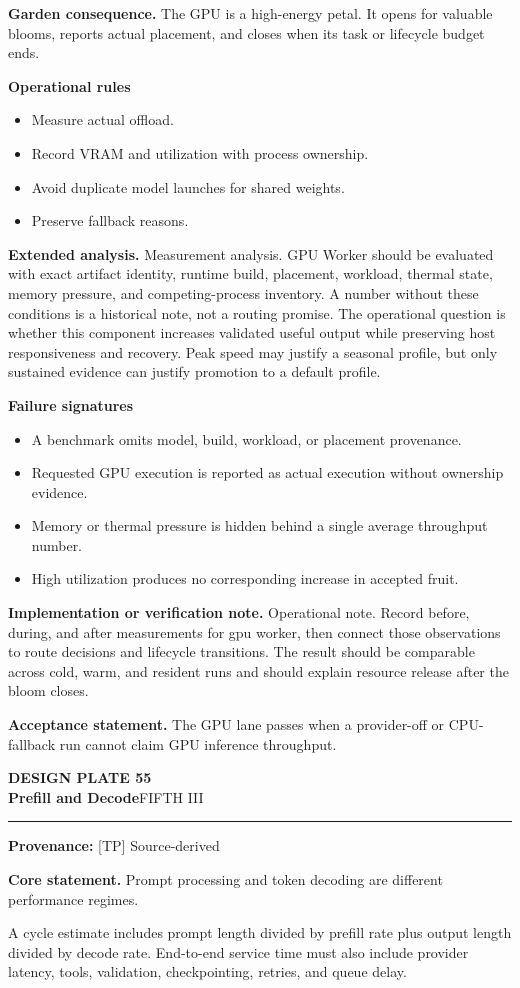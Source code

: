 \documentclass[10pt,letterpaper,oneside]{article}
\newcommand{\prov}[1]{\textcolor{gardenBlue}{\sffamily\footnotesize\textbf{Provenance:} #1}}
\newcommand{\platetitle}[3]{%
  \begin{minipage}[t][0.54in][t]{\textwidth}
  {\sffamily\bfseries\color{gardenDeep}\fontsize{9}{10}\selectfont DESIGN PLATE #1}\\[-1pt]
  {\sffamily\bfseries\color{gardenInk}\fontsize{16.5}{18}\selectfont #2}\hfill{\sffamily\color{gardenGreen}\large #3}
  \end{minipage}\vspace{-2pt}\hrule\vspace{5pt}}
\begin{document}
\textbf{Garden consequence.} The GPU is a high-energy petal. It opens for valuable blooms, reports actual placement, and closes when its task or lifecycle budget ends.

\textbf{Operational rules}
\begin{itemize}
\item Measure actual offload.
\item Record VRAM and utilization with process ownership.
\item Avoid duplicate model launches for shared weights.
\item Preserve fallback reasons.
\end{itemize}
\textbf{Extended analysis.} Measurement analysis. GPU Worker should be evaluated with exact artifact identity, runtime build, placement, workload, thermal state, memory pressure, and competing-process inventory. A number without these conditions is a historical note, not a routing promise. The operational question is whether this component increases validated useful output while preserving host responsiveness and recovery. Peak speed may justify a seasonal profile, but only sustained evidence can justify promotion to a default profile.

\textbf{Failure signatures}
\begin{itemize}
\item A benchmark omits model, build, workload, or placement provenance.
\item Requested GPU execution is reported as actual execution without ownership evidence.
\item Memory or thermal pressure is hidden behind a single average throughput number.
\item High utilization produces no corresponding increase in accepted fruit.
\end{itemize}
\textbf{Implementation or verification note.} Operational note. Record before, during, and after measurements for gpu worker, then connect those observations to route decisions and lifecycle transitions. The result should be comparable across cold, warm, and resident runs and should explain resource release after the bloom closes.

\begin{acceptbox}
\textbf{Acceptance statement.} The GPU lane passes when a provider-off or CPU-fallback run cannot claim GPU inference throughput.
\end{acceptbox}
\newpage
\platetitle{55}{Prefill and Decode}{FIFTH III}
\prov{[TP] Source-derived}
\fontsize{8.85}{10.45}\selectfont
\begin{corebox}
\textbf{Core statement.} Prompt processing and token decoding are different performance regimes.
\end{corebox}
A cycle estimate includes prompt length divided by prefill rate plus output length divided by decode rate. End-to-end service time must also include provider latency, tools, validation, checkpointing, retries, and queue delay.
\end{document}

